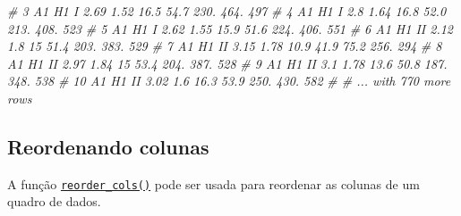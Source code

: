 \documentclass[
]{book}
\newenvironment{Shaded}{\begin{snugshade}}{\end{snugshade}}
\newcommand{\CommentTok}[1]{\textcolor[rgb]{0.56,0.35,0.01}{\textit{#1}}}
\begin{document}
\begin{Shaded}
\begin{Highlighting}[]
\CommentTok{#  3 A1    H1    I      2.69  1.52  16.5  54.7 230.   464.   497}
\CommentTok{#  4 A1    H1    I      2.8   1.64  16.8  52.0 213.   408.   523}
\CommentTok{#  5 A1    H1    I      2.62  1.55  15.9  51.6 224.   406.   551}
\CommentTok{#  6 A1    H1    II     2.12  1.8   15    51.4 203.   383.   529}
\CommentTok{#  7 A1    H1    II     3.15  1.78  10.9  41.9  75.2  256.   294}
\CommentTok{#  8 A1    H1    II     2.97  1.84  15    53.4 204.   387.   528}
\CommentTok{#  9 A1    H1    II     3.1   1.78  13.6  50.8 187.   348.   538}
\CommentTok{# 10 A1    H1    II     3.02  1.6   16.3  53.9 250.   430.   582}
\CommentTok{# # ... with 770 more rows}
\end{Highlighting}
\end{Shaded}

\hypertarget{reordenando-colunas}{%
\subsection{Reordenando colunas}\label{reordenando-colunas}}

A função \href{https://tiagoolivoto.github.io/metan/reference/utils_rows_cols.html}{\texttt{reorder\_cols()}} pode ser usada para reordenar as colunas de um quadro de dados.
\end{document}
